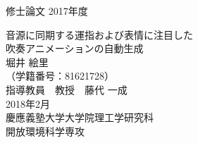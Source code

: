 {\LARGE 修士論文} \hspace{\fill} {\LARGE 2017年度}
\vspace{3cm}
\begin{center}
{\LARGE 音源に同期する運指および表情に注目した\\吹奏アニメーションの自動生成}
\\
\vspace{2cm}
{\Huge 堀井 絵里} \\ \vspace{1.5ex}
{\LARGE （学籍番号：81621728）} \\
\vspace{6.5cm}
{\LARGE 指導教員　教授　藤代 一成} \\
\vspace{2.5cm}
{\Large 2018年2月} \\
\vspace{0.8cm}
{\LARGE 慶應義塾大学大学院理工学研究科} \\ \vspace{1.5ex}
{\LARGE 開放環境科学専攻} \\
\end{center}
